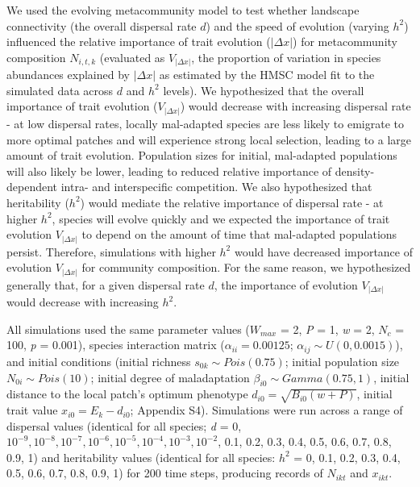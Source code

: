 \documentclass[
]{article}
\begin{document}
We used the evolving metacommunity model to test whether landscape connectivity (the overall dispersal rate \(d\)) and the speed of evolution (varying \(h^2\)) influenced the relative importance of trait evolution (\(|\Delta x|\)) for metacommunity composition \(N_{i,t,k}\) (evaluated as \(V_{|\Delta x|}\), the proportion of variation in species abundances explained by \(|\Delta x|\) as estimated by the HMSC model fit to the simulated data across \(d\) and \(h^2\) levels). We hypothesized that the overall importance of trait evolution (\(V_{|\Delta x|}\)) would decrease with increasing dispersal rate - at low dispersal rates, locally mal-adapted species are less likely to emigrate to more optimal patches and will experience strong local selection, leading to a large amount of trait evolution. Population sizes for initial, mal-adapted populations will also likely be lower, leading to reduced relative importance of density-dependent intra- and interspecific competition. We also hypothesized that heritability (\(h^2\)) would mediate the relative importance of dispersal rate - at higher \(h^2\), species will evolve quickly and we expected the importance of trait evolution \(V_{|\Delta x|}\) to depend on the amount of time that mal-adapted populations persist. Therefore, simulations with higher \(h^2\) would have decreased importance of evolution \(V_{|\Delta x|}\) for community composition. For the same reason, we hypothesized generally that, for a given dispersal rate \(d\), the importance of evolution \(V_{|\Delta x|}\) would decrease with increasing \(h^2\).

All simulations used the same parameter values (\(W_{max}\) = 2, \emph{P} = 1, \emph{w} = 2, \(N_c\) = 100, \emph{p} = 0.001), species interaction matrix (\(\alpha_{ii} = 0.00125\); \(\alpha_{ij} \sim U(0,0.0015)\)), and initial conditions (initial richness \(s_{0k} \sim Pois(0.75)\); initial population size \(N_{0i} \sim Pois(10)\); initial degree of maladaptation \(\beta_{i0} \sim Gamma(0.75,1)\), initial distance to the local patch's optimum phenotype \(d_{i0}=\sqrt{B_{i0}(w+P)}\), initial trait value \(x_{i0} = E_k - d_{i0}\); Appendix S4). Simulations were run across a range of dispersal values (identical for all species; \emph{d} = 0, \(10^{-9},10^{-8},10^{-7},10^{-6},10^{-5},10^{-4},10^{-3},10^{-2}\), 0.1, 0.2, 0.3, 0.4, 0.5, 0.6, 0.7, 0.8, 0.9, 1) and heritability values (identical for all species: \(h^2\) = 0, 0.1, 0.2, 0.3, 0.4, 0.5, 0.6, 0.7, 0.8, 0.9, 1) for 200 time steps, producing records of \(N_{ikt}\) and \(x_{ikt}\).
\end{document}
